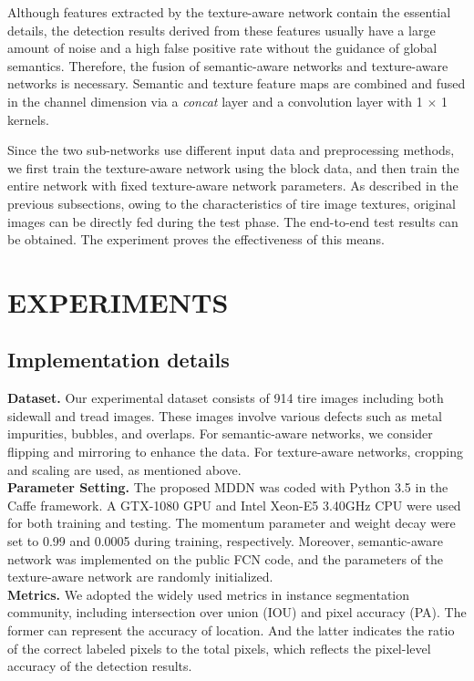 \documentclass{article}
\begin{document}
Although features extracted by the texture-aware network contain the essential details, the detection results derived from these features usually have a large amount of noise and a high false positive rate without the guidance of global semantics. Therefore, the fusion of semantic-aware networks and texture-aware networks is necessary. Semantic and texture feature maps are combined and fused in the channel dimension via a {\it concat} layer and a convolution layer with 1 $\times$ 1 kernels.

Since the two sub-networks use different input data and preprocessing methods, we first train the texture-aware network using the block data, and then train the entire network with fixed texture-aware network parameters. As described in the previous subsections, owing to the characteristics of tire image textures, original images can be directly fed during the test phase. The end-to-end test results can be obtained. The experiment proves the effectiveness of this means.

\section{EXPERIMENTS}
\label{sec:pagestyle}
\subsection{Implementation details}
\label{Implementation details}
{\bf Dataset.} Our experimental dataset consists of 914 tire images including both sidewall and tread images. These images involve various defects such as metal impurities, bubbles, and overlaps. For semantic-aware networks, we consider flipping and mirroring to enhance the data. For texture-aware networks, cropping and scaling are used, as mentioned above.\\
{\bf Parameter Setting.} The proposed MDDN was coded with Python 3.5 in the Caffe framework. A GTX-1080 GPU and Intel Xeon-E5 3.40GHz CPU were used for both training and testing. The momentum parameter and weight decay were set to 0.99 and 0.0005 during training, respectively. Moreover, semantic-aware network was implemented on the public FCN code, and the parameters of the texture-aware network are randomly initialized. \\
{\bf Metrics.} We adopted the widely used metrics in instance segmentation community, including intersection over union (IOU) and pixel accuracy (PA). The former can represent the accuracy of location. And the latter indicates the ratio of the correct labeled pixels to the total pixels, which reflects the pixel-level accuracy of the detection results.
\end{document}
